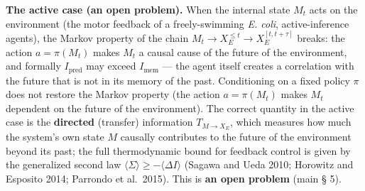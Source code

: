 \documentclass[pdflatex,sn-mathphys-ay]{sn-jnl}
\begin{document}
\textbf{The active case (an open problem).} When the internal state \(M_t\) acts on the environment (the motor feedback of a freely-swimming \emph{E. coli}, active-inference agents), the Markov property of the chain \(M_t \to X_E^{\le t} \to X_E^{[t, t+\tau]}\) breaks: the action \(a = \pi(M_t)\) makes \(M_t\) a causal cause of the future of the environment, and formally \(I_{\text{pred}}\) may exceed \(I_{\text{mem}}\) --- the agent itself creates a correlation with the future that is not in its memory of the past. Conditioning on a fixed policy \(\pi\) does not restore the Markov property (the action \(a = \pi(M_t)\) makes \(M_t\) dependent on the future of the environment). The correct quantity in the active case is the \textbf{directed} (transfer) information \(T_{M \to X_E}\), which measures how much the system's own state \(M\) causally contributes to the future of the environment beyond its past; the full thermodynamic bound for feedback control is given by the generalized second law \(\langle\Sigma\rangle \ge -\langle\Delta I\rangle\) (Sagawa and Ueda 2010; Horowitz and Esposito 2014; Parrondo et al.~2015). This is \textbf{an open problem} (main § 5).
\end{document}
